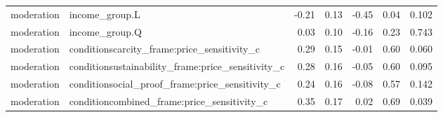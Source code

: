 \begin{table}
\begin{tabular}[t]{llrrrrr}
moderation & income\_group.L & -0.21 & 0.13 & -0.45 & 0.04 & 0.102\\
\addlinespace
moderation & income\_group.Q & 0.03 & 0.10 & -0.16 & 0.23 & 0.743\\
moderation & conditionscarcity\_frame:price\_sensitivity\_c & 0.29 & 0.15 & -0.01 & 0.60 & 0.060\\
moderation & conditionsustainability\_frame:price\_sensitivity\_c & 0.28 & 0.16 & -0.05 & 0.60 & 0.095\\
moderation & conditionsocial\_proof\_frame:price\_sensitivity\_c & 0.24 & 0.16 & -0.08 & 0.57 & 0.142\\
moderation & conditioncombined\_frame:price\_sensitivity\_c & 0.35 & 0.17 & 0.02 & 0.69 & 0.039\\
\bottomrule
\end{tabular}
\end{table}
